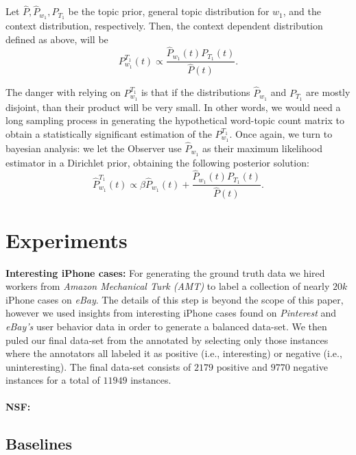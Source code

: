 \documentclass{article} %
\begin{document}
\bep
Let $\widehat{P},\widehat{P}_{w_1},P_{T_1}$ be the topic prior, general
topic distribution for $w_1$, and the context distribution,
respectively. Then, the context dependent distribution defined as
above, will be
\[P^{T_1}_{w_1}(t)\propto \frac{\widehat{P}_{w_1}\!(t)P_{T_1}\!(t)}{\widehat{P}(t)}.\]
\eep

The danger with relying on $P^{T_1}_{w_1}$
is that if the distributions $\widehat{P}_{w_1}$ and $P_{T_1}$ are
mostly disjoint, than their product will be very small. In other
words, we would need a long sampling process in generating the
hypothetical word-topic count matrix to obtain a statistically
significant estimation of the $P^{T_1}_{w_1}$. Once again,
we turn to bayesian analysis: we let the Observer use
$\widehat{P}_{w_1}$ as their maximum likelihood estimator in a
Dirichlet prior, obtaining the following posterior solution:
\[\widehat{P}^{T_1}_{w_1}(t)\propto \beta \widehat{P}_{w_1}\!(t) + \frac{\widehat{P}_{w_1}\!(t)P_{T_1}\!(t)}{\widehat{P}(t)}.\]



\section{Experiments}
\label{sec:experiments}

{\bf Interesting iPhone cases:} 
For generating the ground truth data we hired workers from {\em Amazon Mechanical Turk (AMT)} to label a collection
of nearly $20k$ iPhone cases on {\em eBay}. The details of this step is beyond the scope of this paper, however we used insights from
interesting iPhone cases found on {\em Pinterest} and {\em eBay's} user behavior data in order to generate a balanced data-set. 
We then puled our final data-set from the annotated by selecting only those instances where the annotators all labeled it as
positive (i.e., interesting) or negative (i.e., uninteresting). The final data-set consists of $2179$ positive and $9770$ negative instances for
a total of $11949$ instances.\\
\\

{\bf NSF:}


\subsection{Baselines}
\label{sec:baselines}
\end{document}
